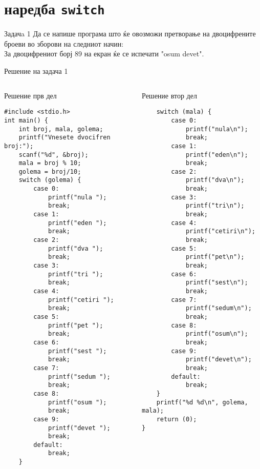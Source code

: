 \section{наредба \texttt{switch}}
\begin{frame}{Задачa 1}
Да се напише програма што ќе овозможи претворање на двоцифрените броеви во
зборови на следниот начин:\\
За двоцифрениот борј 89 на екран ќе се испечати
"osum devet".
\end{frame}

\begin{frame}[t,fragile,shrink=35]{Решение на задача 1}
\begin{columns}
\begin{exampleblock}{Решение прв дел}
\begin{lstlisting}
#include <stdio.h>
int main() {
    int broj, mala, golema;
    printf("Vnesete dvocifren broj:");
    scanf("%d", &broj);
    mala = broj % 10;
    golema = broj/10;
    switch (golema) {
        case 0:
            printf("nula ");
            break;
        case 1:
            printf("eden ");
            break;
        case 2:
            printf("dva ");
            break;
        case 3:
            printf("tri ");
            break;
        case 4:
            printf("cetiri ");
            break;
        case 5:
            printf("pet ");
            break;
        case 6:
            printf("sest ");
            break;
        case 7:
            printf("sedum ");
            break;
        case 8:
            printf("osum ");
            break;
        case 9:
            printf("devet ");
            break;
        default:
            break;
    }
\end{lstlisting}
\end{exampleblock}
\begin{exampleblock}{Решение втор дел}
\begin{lstlisting}
    switch (mala) {
        case 0:
            printf("nula\n");
            break;
        case 1:
            printf("eden\n");
            break;
        case 2:
            printf("dva\n");
            break;
        case 3:
            printf("tri\n");
            break;
        case 4:
            printf("cetiri\n");
            break;
        case 5:
            printf("pet\n");
            break;
        case 6:
            printf("sest\n");
            break;
        case 7:
            printf("sedum\n");
            break;
        case 8:
            printf("osum\n");
            break;
        case 9:
            printf("devet\n");
            break;
        default:
            break;
    }
    printf("%d %d\n", golema, mala);
    return (0);
}
\end{lstlisting}
\end{exampleblock}
\end{columns}
\end{frame}


